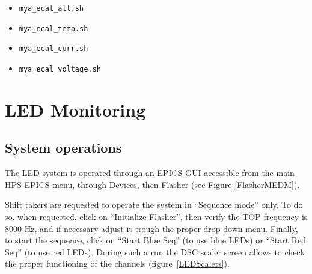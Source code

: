 \documentclass[12pt]{article}
\begin{document}
      \begin{itemize}
          \item \texttt{mya\_ecal\_all.sh}
          \item \texttt{mya\_ecal\_temp.sh}
          \item \texttt{mya\_ecal\_curr.sh}
          \item \texttt{mya\_ecal\_voltage.sh}
      \end{itemize}

\newpage

   \section{LED Monitoring}
      \subsection{System operations}
      The LED system is operated through an EPICS GUI accessible from the main HPS EPICS menu, through Devices, then Flasher (see Figure \ref{FlasherMEDM}).

Shift takers are requested to operate the system in ``Sequence mode'' only. To do so, when requested, click on ``Initialize Flasher'', then verify the TOP frequency is 8000 Hz, and if necessary adjust it trough the proper drop-down menu. Finally, to start the sequence, click on ``Start Blue Seq'' (to use blue LEDs) or ``Start Red Seq'' (to use red LEDs). During such a run the DSC scaler screen allows to check the proper functioning of the channels (figure~\ref{LEDScalers}). 
\end{document}
